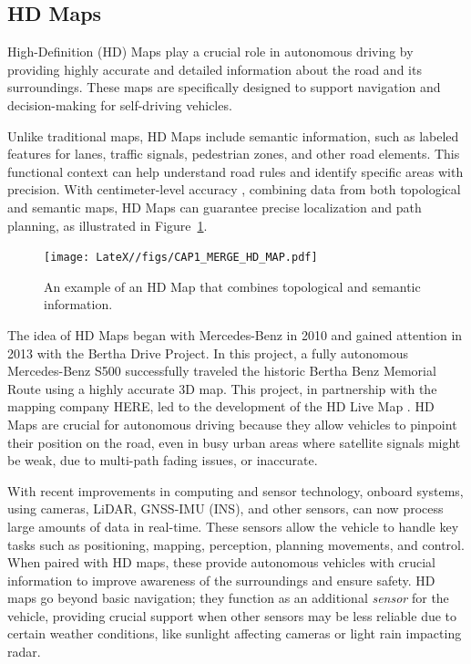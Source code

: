 \subsection{HD Maps}
High-Definition (HD) Maps play a crucial role in autonomous driving by providing highly accurate and detailed information about the road and its surroundings. These maps are specifically designed to support navigation and decision-making for self-driving vehicles.

Unlike traditional maps, HD Maps include semantic information, such as labeled features for lanes, traffic signals, pedestrian zones, and other road elements. This functional context can help understand road rules and identify specific areas with precision. With centimeter-level accuracy \cite{geospatialworld_hd_maps}, combining data from both topological and semantic maps, HD Maps can guarantee precise localization and path planning, as illustrated in Figure~\ref{fig:hd_map}.
\begin{figure}[H]
    \centering
    \texttt{[image: LateX//figs/CAP1\_MERGE\_HD\_MAP.pdf]}
    \caption{An example of an HD Map that combines topological and semantic information.}
    \label{fig:hd_map}
\end{figure}

The idea of HD Maps began with Mercedes-Benz in 2010 and gained attention in 2013 with the Bertha Drive Project. In this project, a fully autonomous Mercedes-Benz S500 successfully traveled the historic Bertha Benz Memorial Route using a highly accurate 3D map. This project, in partnership with the mapping company HERE, led to the development of the HD Live Map \cite{8105770}.
HD Maps are crucial for autonomous driving because they allow vehicles to pinpoint their position on the road, even in busy urban areas where satellite signals might be weak, due to multi-path fading issues, or inaccurate.

With recent improvements in computing and sensor technology, onboard systems, using cameras, LiDAR, GNSS-IMU (INS), and other sensors, can now process large amounts of data in real-time. These sensors allow the vehicle to handle key tasks such as positioning, mapping, perception, planning movements, and control. When paired with HD maps, these provide autonomous vehicles with crucial information to improve awareness of the surroundings and ensure safety.
HD maps go beyond basic navigation; they function as an additional \textit{sensor} for the vehicle, providing crucial support when other sensors may be less reliable due to certain weather conditions, like sunlight affecting cameras or light rain impacting radar\cite{edmap_2004}.

